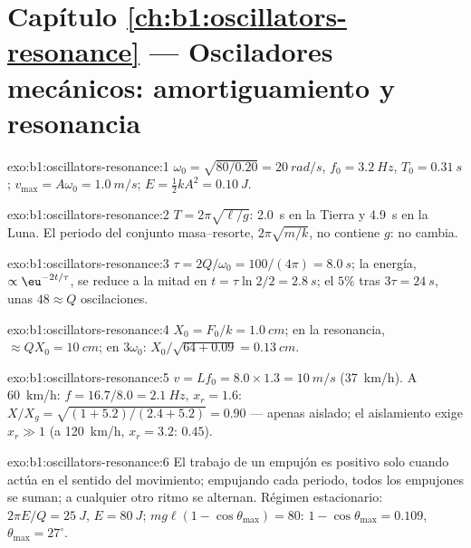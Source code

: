 \section*{Capítulo \ref{ch:b1:oscillators-resonance} --- Osciladores mecánicos: amortiguamiento y resonancia}

\begin{solution}{exo:b1:oscillators-resonance:1}
$\omega_0 = \sqrt{80/0.20} = \qty{20}{rad/s}$, $f_0 = \qty{3.2}{Hz}$, $T_0 =
\qty{0.31}{s}$; $v_{\max} = A\omega_0 = \qty{1.0}{m/s}$; $E = \tfrac12 kA^2 =
\qty{0.10}{J}$.
\end{solution}

\begin{solution}{exo:b1:oscillators-resonance:2}
$T = 2\pi\sqrt{\ell/g}$: \qty{2.0}{s} en la Tierra y \qty{4.9}{s} en la
Luna. El periodo del conjunto masa--resorte, $2\pi\sqrt{m/k}$, no contiene
$g$: no cambia.
\end{solution}

\begin{solution}{exo:b1:oscillators-resonance:3}
$\tau = 2Q/\omega_0 = 100/(4\pi) = \qty{8.0}{s}$; la energía, $\propto \eu^{-2t/\tau}$,
se reduce a la mitad en $t = \tau\ln2/2 = \qty{2.8}{s}$; el $5\%$ tras
$3\tau = \qty{24}{s}$, unas $48 \approx Q$ oscilaciones.
\end{solution}

\begin{solution}{exo:b1:oscillators-resonance:4}
$X_0 = F_0/k = \qty{1.0}{cm}$; en la resonancia, $\approx QX_0 = \qty{10}{cm}$;
en $3\omega_0$: $X_0/\sqrt{64 + 0.09} = \qty{0.13}{cm}$.
\end{solution}

\begin{solution}{exo:b1:oscillators-resonance:5}
$v = Lf_0 = 8.0 \times 1.3 = \qty{10}{m/s}$ (\qty{37}{km/h}). A
\qty{60}{km/h}: $f = 16.7/8.0 = \qty{2.1}{Hz}$, $x_r = 1.6$: $X/X_g =
\sqrt{(1 + 5.2)/(2.4 + 5.2)} = 0.90$ --- apenas aislado; el aislamiento
exige $x_r \gg 1$ (a \qty{120}{km/h}, $x_r = 3.2$: $0.45$).
\end{solution}

\begin{solution}{exo:b1:oscillators-resonance:6}
El trabajo de un empujón es positivo solo cuando actúa en el sentido del
movimiento; empujando cada periodo, todos los empujones se suman; a
cualquier otro ritmo se alternan. Régimen estacionario:
$2\pi E/Q = \qty{25}{J}$, $E = \qty{80}{J}$;
$mg\ell(1 - \cos\theta_{\max}) = 80$: $1 - \cos\theta_{\max} = 0.109$,
$\theta_{\max} = 27^\circ$.
\end{solution}

